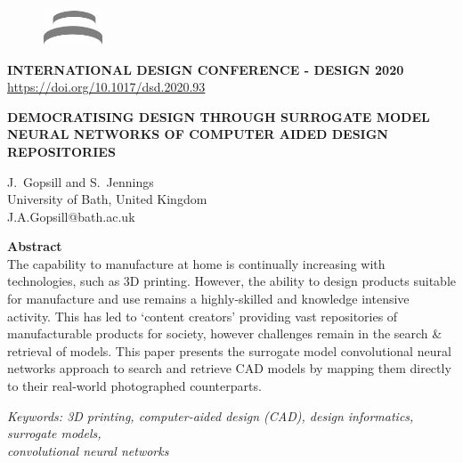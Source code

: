 {
  \titlefont
  \small
  \begin{figure}
    \raggedleft
    \vspace{-0.2cm}
    \includegraphics[width=1.8cm]{figs/design-logo.png}
  \end{figure}
  \noindent \textbf{INTERNATIONAL DESIGN CONFERENCE - DESIGN 2020}\\
  \url{https://doi.org/10.1017/dsd.2020.93}

  \vspace{2cm}

  \Large\noindent\textbf{DEMOCRATISING DESIGN THROUGH SURROGATE MODEL NEURAL NETWORKS OF COMPUTER AIDED DESIGN REPOSITORIES}

  \vspace{1cm}

  \normalsize \noindent J.\ Gopsill and S.\ Jennings \\[0.2cm]
  \footnotesize \noindent University of Bath, United Kingdom \\[0.1cm]
  \footnotesize \noindent J.A.Gopsill@bath.ac.uk\\

  \begin{mdframed}[backgroundcolor=gray!20] 
    \normalsize \noindent \textbf{Abstract} \\
    \normalfont The capability to manufacture at home is continually increasing with technologies, such as 3D printing. 
    However, the ability to design products suitable for manufacture and use remains a highly-skilled and knowledge intensive activity.
    This has led to `content creators' providing vast repositories of manufacturable products for society, however challenges remain in the search \& retrieval of models.
    This paper presents the surrogate model convolutional neural networks approach to search and retrieve CAD models by mapping them directly to their real-world photographed counterparts.
  \end{mdframed}

  \small \noindent \textit{Keywords: 3D printing, computer-aided design (CAD), design informatics, surrogate models,\\ convolutional neural networks}

  \vspace{0cm}
}
